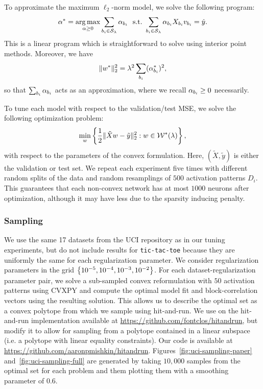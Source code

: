 To approximate the maximum \( \ell_2 \)-norm model, we solve the
following program:
\begin{equation*}
    \begin{aligned}
        \alpha^* = \mathop{\rm arg\,max}_{\alpha \geq 0} \sum_{{b_i} \in \mathcal{S}_\lambda} \alpha_{b_i}
        \, \, \text{ s.t.} \, \,
        \sum_{{b_i} \in \mathcal{S}_\lambda} \alpha_{{b_i}} X_{b_i} v_{b_i} = \hat y.
    \end{aligned}
\end{equation*}
This is a linear program which is straightforward to solve using
interior point methods.
Moreover, we have
\[
    \|w^*\|_2^2 = \lambda^2 \sum_{{b_i}} (\alpha_{b_i}^*)^2,
\]
so that \( \sum_{{b_i}} \alpha_{b_i} \) acts as an approximation, where we recall
\( \alpha_{b_i} \geq 0 \) necessarily.

To tune each model with respect to the validation/test MSE, we solve the following optimization problem:
\[
    \min_{w} \left\{ \frac 1 2 \|\tilde X w - \tilde y\|_2^2 : w \in \mathcal{W}^*(\lambda) \right\},
\]
with respect to the parameters of the convex formulation.
Here, \( (\tilde X, \tilde y) \) is either the validation or test
set.
We repeat each experiment five times with different random splits of the
data and random resamplings of \( 500 \) activation patterns \( D_i \).
This guarantees that each non-convex network has at most \( 1000 \) neurons
after optimization, although it may have less due to the sparsity inducing
penalty.

\subsubsection{Sampling}

We use the same 17 datasets from the UCI repository as in our tuning
experiments, but do not include results for \texttt{tic-tac-toe} because
they are uniformly the same for each regularization parameter.
We consider regularization parameters in the grid
\( \left\{10^{-5}, 10^{-4}, 10^{-3}, 10^{-2}\right\} \).
For each dataset-regularization parameter pair, we solve a sub-sampled convex
reformulation with \( 50 \) activation patterns using CVXPY
\citep{diamond2016cvxpy} and compute the optimal model fit and
block-correlation vectors using the resulting solution.
This allows us to describe the optimal set as a convex polytope from which
we sample using hit-and-run.
We use on the hit-and-run implementation available at
\url{https://github.com/fontclos/hitandrun}, but modify it to allow for
sampling from a polytope contained in a linear subspace
(i.e. a polytope with linear equality constraints).
Our code is available at \url{https://github.com/aaronpmishkin/hitandrun}.
Figures~\ref{fig:uci-sampling-paper} and~\ref{fig:uci-sampling-full}
are generated by taking \( 10,000 \) samples from the optimal set for each
problem and them plotting them with a smoothing parameter of \( 0.6 \).


